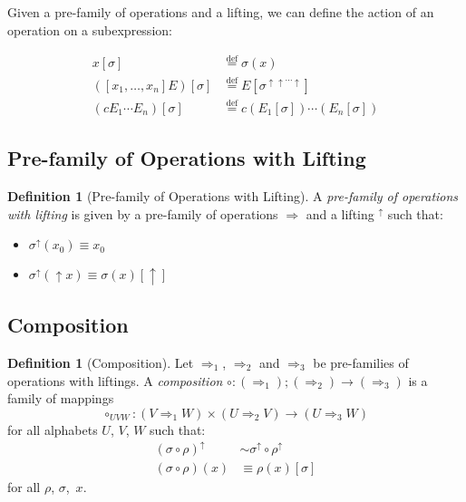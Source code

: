 \documentclass{article}
\newcommand{\eqdef}{\ensuremath{\stackrel{\mathrm{def}}{=}}}
\theoremstyle{definition}
\newtheorem{df}[lm]{Definition}
\begin{document}
Given a pre-family of operations and a lifting, we can define the action of an operation on a subexpression:

\begin{eqnarray*}
 x [ \sigma ] & \eqdef \sigma(x) \\
 ([x_1, \ldots, x_n] E) [ \sigma ] & \eqdef E [ \sigma^{\uparrow \uparrow \cdots \uparrow} ] \\
 (c E_1 \cdots E_n) [ \sigma ] & \eqdef c (E_1 [ \sigma ]) \cdots (E_n [ \sigma ])
\end{eqnarray*}


\subsection{Pre-family of Operations with Lifting}

\begin{df}[Pre-family of Operations with Lifting]
 A \emph{pre-family of operations with lifting} is given by a pre-family of operations $\Rightarrow$ and a lifting $^\uparrow$ such that:
 \begin{itemize}
  \item $\sigma^\uparrow(x_0) \equiv x_0$
  \item $\sigma^\uparrow(\uparrow x) \equiv \sigma(x) [ \uparrow ]$
 \end{itemize}
\end{df}


\subsection{Composition}

\begin{df}[Composition]
 Let $\Rightarrow_1$, $\Rightarrow_2$ and $\Rightarrow_3$ be pre-families of operations with liftings.  A \emph{composition} $\circ : (\Rightarrow_1) ; (\Rightarrow_2) \rightarrow (\Rightarrow_3)$
 is a family of mappings
 \[ \circ_{UVW} : (V \Rightarrow_1 W) \times (U \Rightarrow_2 V) \rightarrow (U \Rightarrow_3 W) \]
 for all alphabets $U$, $V$, $W$ such that:
 \begin{align*}
  (\sigma \circ \rho)^\uparrow & \sim \sigma^\uparrow \circ \rho^\uparrow \\
  (\sigma \circ \rho)(x) & \equiv \rho(x) [ \sigma ]
 \end{align*}
for all $\rho$, $\sigma$, $x$.
\end{df}
\end{document}
